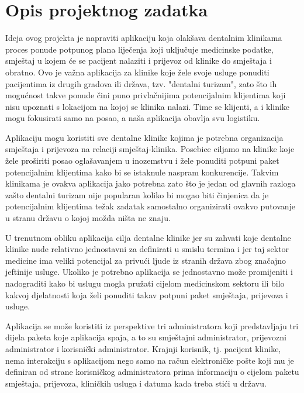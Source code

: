 \chapter{Opis projektnog zadatka}
		
		Ideja ovog projekta je napraviti aplikaciju koja olakšava dentalnim klinikama proces ponude potpunog plana liječenja koji uključuje medicinske podatke, smještaj u kojem će se pacijent nalaziti i prijevoz od klinike do smještaja i obratno. Ovo je važna aplikacija za klinike koje žele svoje usluge ponuditi pacijentima iz drugih gradova ili država, tzv. "dentalni turizam", zato što ih mogućnost takve ponude čini puno privlačnijima potencijalnim klijentima koji nisu upoznati s lokacijom na kojoj se klinika nalazi. Time se klijenti, a i klinike mogu fokusirati samo na posao, a naša aplikacija obavlja svu logistiku.
		
		Aplikaciju mogu koristiti sve dentalne klinike kojima je potrebna organizacija smještaja i prijevoza na relaciji smještaj-klinika. Posebice ciljamo na klinike koje žele proširiti posao oglašavanjem u inozemstvu i žele ponuditi potpuni paket potencijalnim klijentima kako bi se istaknule naspram konkurencije. Takvim klinikama je ovakva aplikacija jako potrebna zato što je jedan od glavnih razloga zašto dentalni turizam nije popularan koliko bi mogao biti činjenica da je potencijalnim klijentima težak zadatak samostalno organizirati ovakvo putovanje u stranu državu o kojoj možda ništa ne znaju.
		
		U trenutnom obliku aplikacija cilja dentalne klinike jer su zahvati koje dentalne klinike nude relativno jednostavni za definirati u smislu termina i jer taj sektor medicine ima veliki potencijal za privući ljude iz stranih država zbog značajno jeftinije usluge. Ukoliko je potrebno aplikacija se jednostavno može promijeniti i nadograditi kako bi uslugu mogla pružati cijelom medicinskom sektoru ili bilo kakvoj djelatnosti koja želi ponuditi takav potpuni paket smještaja, prijevoza i usluge.
		
		\eject
		
		Aplikacija se može koristiti iz perspektive tri administratora koji predstavljaju tri dijela paketa koje aplikacija spaja, a to su smještajni administrator, prijevozni administrator i korisnički administrator. Krajnji korisnik, tj. pacijent klinike, nema interakciju s aplikacijom nego samo na račun elektroničke pošte koji mu je definiran od strane korisničkog administratora prima informaciju o cijelom paketu smještaja, prijevoza, kliničkih usluga i datuma kada treba stići u državu.
		
